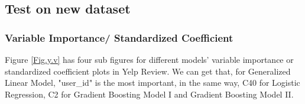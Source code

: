 \documentclass{article}
\begin{document}
\subsection{Test on new dataset}

\subsubsection{Variable Importance/ Standardized Coefficient}
Figure \ref{Fig.y.v} has four sub figures for different models' variable importance or standardized coefficient plots in Yelp Review. We can get that, for Generalized Linear Model, "user\_id" is the most important, in the same way, C40 for Logistic Regression, C2 for Gradient Boosting Model I and Gradient Boosting Model II.
\begin{figure}[H]
\centering
{}
\quad
{}
\end{figure}
\end{document}
